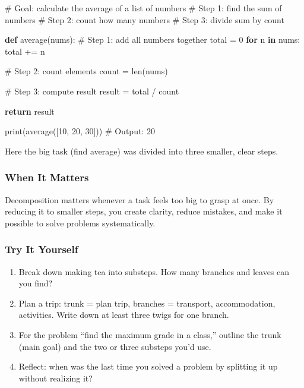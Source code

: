 \documentclass[
  letterpaper,
  DIV=11,
  numbers=noendperiod]{scrreprt}
\newenvironment{Shaded}{\begin{snugshade}}{\end{snugshade}}
\newcommand{\BuiltInTok}[1]{\textcolor[rgb]{0.00,0.23,0.31}{#1}}
\newcommand{\CommentTok}[1]{\textcolor[rgb]{0.37,0.37,0.37}{#1}}
\newcommand{\ControlFlowTok}[1]{\textcolor[rgb]{0.00,0.23,0.31}{\textbf{#1}}}
\newcommand{\DecValTok}[1]{\textcolor[rgb]{0.68,0.00,0.00}{#1}}
\newcommand{\KeywordTok}[1]{\textcolor[rgb]{0.00,0.23,0.31}{\textbf{#1}}}
\newcommand{\NormalTok}[1]{\textcolor[rgb]{0.00,0.23,0.31}{#1}}
\newcommand{\OperatorTok}[1]{\textcolor[rgb]{0.37,0.37,0.37}{#1}}
\providecommand{\tightlist}{%
  \setlength{\itemsep}{0pt}\setlength{\parskip}{0pt}}
\begin{document}
\begin{Shaded}
\begin{Highlighting}[]
\CommentTok{\# Goal: calculate the average of a list of numbers}
\CommentTok{\# Step 1: find the sum of numbers}
\CommentTok{\# Step 2: count how many numbers}
\CommentTok{\# Step 3: divide sum by count}

\KeywordTok{def}\NormalTok{ average(nums):}
    \CommentTok{\# Step 1: add all numbers together}
\NormalTok{    total }\OperatorTok{=} \DecValTok{0}
    \ControlFlowTok{for}\NormalTok{ n }\KeywordTok{in}\NormalTok{ nums:}
\NormalTok{        total }\OperatorTok{+=}\NormalTok{ n}
    
    \CommentTok{\# Step 2: count elements}
\NormalTok{    count }\OperatorTok{=} \BuiltInTok{len}\NormalTok{(nums)}
    
    \CommentTok{\# Step 3: compute result}
\NormalTok{    result }\OperatorTok{=}\NormalTok{ total }\OperatorTok{/}\NormalTok{ count}
    
    \ControlFlowTok{return}\NormalTok{ result}

\BuiltInTok{print}\NormalTok{(average([}\DecValTok{10}\NormalTok{, }\DecValTok{20}\NormalTok{, }\DecValTok{30}\NormalTok{]))  }\CommentTok{\# Output: 20}
\end{Highlighting}
\end{Shaded}

Here the big task (find average) was divided into three smaller, clear
steps.

\subsubsection{When It Matters}\label{when-it-matters-28}

Decomposition matters whenever a task feels too big to grasp at once. By
reducing it to smaller steps, you create clarity, reduce mistakes, and
make it possible to solve problems systematically.

\subsubsection{Try It Yourself}\label{try-it-yourself-30}

\begin{enumerate}
\def\labelenumi{\arabic{enumi}.}
\tightlist
\item
  Break down making tea into substeps. How many branches and leaves can
  you find?
\item
  Plan a trip: trunk = plan trip, branches = transport, accommodation,
  activities. Write down at least three twigs for one branch.
\item
  For the problem ``find the maximum grade in a class,'' outline the
  trunk (main goal) and the two or three substeps you'd use.
\item
  Reflect: when was the last time you solved a problem by splitting it
  up without realizing it?
\end{enumerate}
\end{document}
